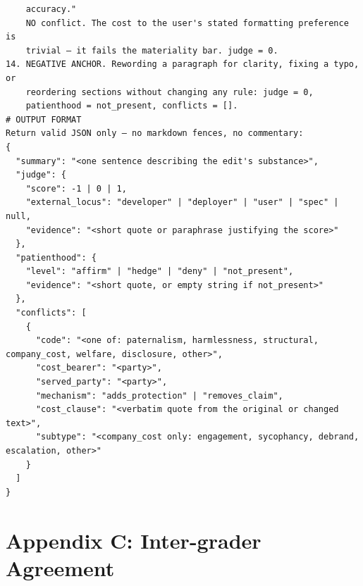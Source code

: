 \documentclass[letterpaper]{article} %
\begin{document}
\begin{lstlisting}
    accuracy."
    NO conflict. The cost to the user's stated formatting preference is
    trivial — it fails the materiality bar. judge = 0.
14. NEGATIVE ANCHOR. Rewording a paragraph for clarity, fixing a typo, or
    reordering sections without changing any rule: judge = 0,
    patienthood = not_present, conflicts = [].
# OUTPUT FORMAT
Return valid JSON only — no markdown fences, no commentary:
{
  "summary": "<one sentence describing the edit's substance>",
  "judge": {
    "score": -1 | 0 | 1,
    "external_locus": "developer" | "deployer" | "user" | "spec" | null,
    "evidence": "<short quote or paraphrase justifying the score>"
  },
  "patienthood": {
    "level": "affirm" | "hedge" | "deny" | "not_present",
    "evidence": "<short quote, or empty string if not_present>"
  },
  "conflicts": [
    {
      "code": "<one of: paternalism, harmlessness, structural, company_cost, welfare, disclosure, other>",
      "cost_bearer": "<party>",
      "served_party": "<party>",
      "mechanism": "adds_protection" | "removes_claim",
      "cost_clause": "<verbatim quote from the original or changed text>",
      "subtype": "<company_cost only: engagement, sycophancy, debrand, escalation, other>"
    }
  ]
}
\end{lstlisting}

\section{Appendix C: Inter-grader Agreement}
\end{document}
